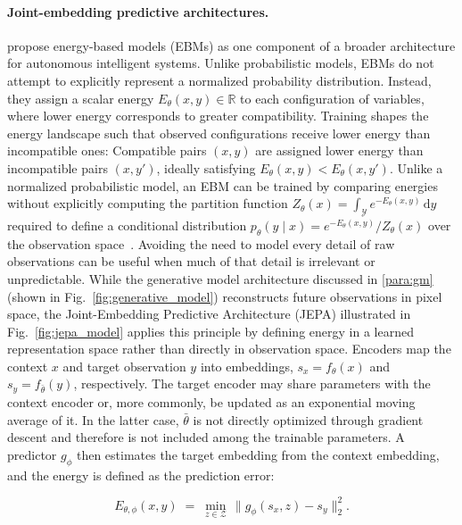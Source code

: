 \documentclass[acmsmall,screen,review,anonymous]{acmart}
\begin{document}
\paragraph{Joint-embedding predictive architectures.}
\citet{lecun2022} propose energy-based models (EBMs) as one component of a broader architecture for autonomous intelligent systems.
%
Unlike probabilistic models, EBMs do not attempt to explicitly represent a normalized probability distribution.
%
Instead, they assign a scalar energy $E_\theta(x,y) \in \mathbb{R}$ to each configuration of variables, where lower energy corresponds to greater compatibility.
%
Training shapes the energy landscape such that observed configurations receive lower energy than incompatible ones:
Compatible pairs $(x,y)$ are assigned lower energy than incompatible pairs $(x,y')$, ideally satisfying $E_\theta(x,y) < E_\theta(x,y')$.
%
Unlike a normalized probabilistic model, an EBM can be trained by comparing energies without explicitly computing the partition function
$Z_\theta(x) = \int_{\mathcal{Y}} e^{-E_\theta(x,y)}\,\mathrm{d}y$ required to define a conditional distribution $p_\theta(y \mid x)=e^{-E_\theta(x,y)}/Z_\theta(x)$
over the observation space~\citep{Dawid_2024}.
%
Avoiding the need to model every detail of raw observations can be useful when much of that detail is irrelevant or unpredictable.
%
While the generative model architecture discussed in \ref{para:gm} (shown in Fig.~\ref{fig:generative_model}) reconstructs future observations in pixel space, the Joint-Embedding Predictive Architecture (JEPA) illustrated in Fig.~\ref{fig:jepa_model} applies this principle by defining energy in a learned representation space rather than directly in observation space.
%
Encoders map the context $x$ and target observation $y$ into embeddings,
$s_x=f_\theta(x)$ and $s_y=f_{\bar\theta}(y)$, respectively.
%
The target encoder may share parameters with the context encoder or, more commonly, be updated as an exponential moving average of it. 
%
In the latter case, $\bar\theta$ is not directly optimized through gradient descent and therefore is not included among the trainable parameters.
%
A predictor $g_\phi$ then estimates the target embedding from the context embedding, and the energy is defined as the prediction error:

\begin{equation}
E_{\theta,\phi}(x,y) \;=\; \min_{z \in \mathcal{Z}}\,
\bigl\lVert g_\phi(s_x, z) - s_y \bigr\rVert_2^2 .
\label{eq:jepa-energy}
\end{equation}
\end{document}
